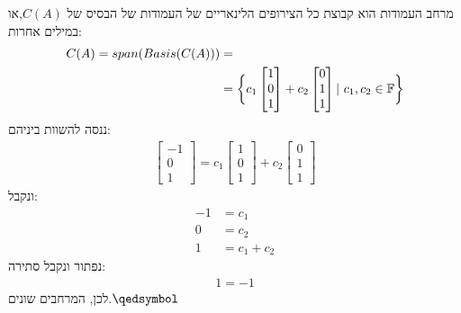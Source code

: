 \documentclass[a4paper, 12pt, leqno]{article}
\newcommand{\F}{\ensuremath{\mathbb{F}}}
\newcommand{\eq}[1]{\begin{align*}#1\end{align*}}
\newcommand{\bigset}[1]{\bigg{\{} #1 \bigg{\}}}
\renewcommand{\qed}{\hfill\(\qedsymbol\)}
\begin{document}
מרחב העמודות הוא קבוצת כל הצירופים הלינאריים של העמודות של הבסיס של $C(A)$,או במילים אחרות:
\eq{
    C(A)=span(Basis(C(A)))&=\\
    &=\bigset{
        c_1\begin{bmatrix}1\\0\\1\end{bmatrix}
        +c_2\begin{bmatrix}0\\1\\1\end{bmatrix}
        |~c_1,c_2\in\F
    }
}
ננסה להשוות ביניהם:
\eq{
    \begin{bmatrix}
        -1\\0\\1
    \end{bmatrix}
    =
    c_1\begin{bmatrix}1\\0\\1\end{bmatrix}
    +c_2\begin{bmatrix}0\\1\\1\end{bmatrix}
}
ונקבל:
\eq{
    -1&=c_1\\
    0&=c_2\\
    1&=c_1+c_2
}
נפתור ונקבל סתירה:
\eq{
    1=-1
}
לכן, המרחבים שונים.\qed

\section{}

\end{document}
